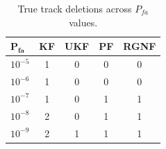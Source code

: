 \begin{table}[H]
    \centering
    \caption{True track deletions across $P_{fa}$ values.}
    \label{tab:Pttd}
    \setlength{\tabcolsep}{3.5pt}
    \begin{tabular}{@{}lcccc@{}}
        \toprule
        $\mathbf{P_{fa}}$ & \textbf{KF} & \textbf{UKF} & \textbf{PF} & \textbf{RGNF} \\
        \midrule
        $10^{-5}$ & 1 & \cellcolor{green!20}0 & \cellcolor{green!20}0 & \cellcolor{green!20}0 \\
        $10^{-6}$ & 1 & \cellcolor{green!20}0 & \cellcolor{green!20}0 & \cellcolor{green!20}0 \\
        $10^{-7}$ & 1 & \cellcolor{green!20}0 & 1 & 1 \\
        $10^{-8}$ & \cellcolor{red!20}2 & \cellcolor{green!20}0 & 1 & 1 \\
        $10^{-9}$ & \cellcolor{red!20}2 & 1 & 1 & 1 \\
        \bottomrule
    \end{tabular}
\end{table}
